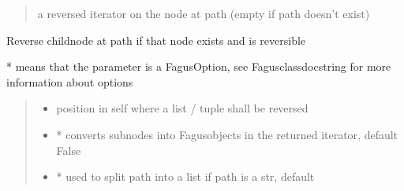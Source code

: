 \documentclass[a4paper,10pt,english]{sphinxmanual}
\begin{document}
\begin{fulllineitems}
\begin{fulllineitems}
\begin{quote}
\begin{description}
\begin{itemize}
\end{itemize}

\sphinxAtStartPar
a reversed iterator on the node at path (empty if path doesn’t exist)

\end{description}\end{quote}

\end{fulllineitems}


\begin{fulllineitems}
\label{\detokenize{fagus.fagus:fagus.fagus.Fagus.reverse}}
\pysigstartsignatures
{}
\pysigstopsignatures
\sphinxAtStartPar
Reverse child\sphinxhyphen{}node at path if that node exists and is reversible

\sphinxAtStartPar
* means that the parameter is a FagusOption, see Fagus\sphinxhyphen{}class\sphinxhyphen{}docstring for more information about options
\begin{quote}\begin{description}
\begin{itemize}
\item {}
\sphinxAtStartPar
{} \textendash{} position in self where a list / tuple shall be reversed

\item {}
\sphinxAtStartPar
{} \textendash{} * converts sub\sphinxhyphen{}nodes into Fagus\sphinxhyphen{}objects in the returned iterator, default False

\item {}
\sphinxAtStartPar
{} \textendash{} * used to split path into a list if path is a str, default 


\end{itemize}
\end{description}
\end{quote}
\end{fulllineitems}
\end{fulllineitems}
\end{document}
